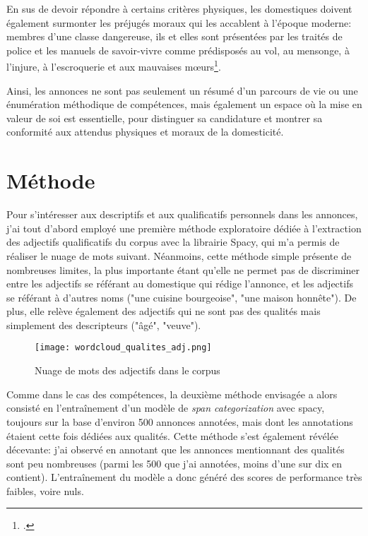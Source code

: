 {En sus de devoir répondre à certains critères physiques, les domestiques doivent également surmonter les préjugés moraux qui les accablent à l'époque moderne: membres d'une classe dangereuse, ils et elles sont présentées par les traités de police et les manuels de savoir-vivre comme prédisposés au vol, au mensonge, à l'injure, à l'escroquerie et aux mauvaises mœurs\footcites{sabattierChapitreOpinionDefavorable1984}. 

Ainsi, les annonces ne sont pas seulement un résumé d'un parcours de vie ou une énumération méthodique de compétences, mais également un espace où la mise en valeur de soi est essentielle, pour distinguer sa candidature et montrer sa conformité aux attendus physiques et moraux de la domesticité. 


\section{Méthode}

Pour s'intéresser aux descriptifs et aux qualificatifs personnels dans les annonces, j'ai tout d'abord employé une première méthode exploratoire dédiée à l'extraction des adjectifs qualificatifs du corpus avec la librairie Spacy, qui m'a permis de réaliser le nuage de mots suivant. Néanmoins, cette méthode simple présente de nombreuses limites, la plus importante étant qu'elle ne permet pas de discriminer entre les adjectifs se référant au domestique qui rédige l'annonce, et les adjectifs se référant à d'autres noms ("une cuisine bourgeoise", "une maison honnête"). De plus, elle relève également des adjectifs qui ne sont pas des qualités mais simplement des descripteurs ("âgé", "veuve").

\begin{figure}[h]
	\centering
	\texttt{[image: wordcloud\_qualites\_adj.png]}
	\caption{Nuage de mots des adjectifs dans le corpus}
\end{figure}


Comme dans le cas des compétences, la deuxième méthode envisagée a alors consisté en l'entraînement d'un modèle de \textit{span categorization} avec spacy, toujours sur la base d'environ 500 annonces annotées, mais dont les annotations étaient cette fois dédiées aux qualités. Cette méthode s'est également révélée décevante: j'ai observé en annotant que les annonces mentionnant des qualités sont peu nombreuses (parmi les 500 que j'ai annotées, moins d'une sur dix en contient). L'entraînement du modèle a donc généré des scores de performance très faibles, voire nuls.

}
